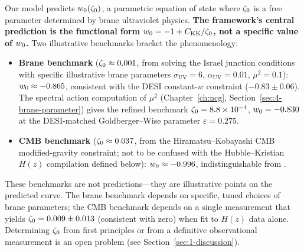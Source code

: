 Our model predicts $w_0(\zeta_0)$, a parametric equation of state where $\zeta_0$ is a free parameter determined by brane ultraviolet physics. \textbf{The framework's central prediction is the functional form $w_0 = -1 + C_{\mathrm{KK}}/\zeta_0$, not a specific value of $w_0$.} Two illustrative benchmarks bracket the phenomenology:
\begin{itemize}
\item \textbf{Brane benchmark} ($\zeta_0 \approx 0.001$, from solving the Israel junction conditions with specific illustrative brane parameters $\sigma_\mathrm{UV} = 6$, $\alpha_\mathrm{UV} = 0.01$, $\mu^2 = 0.1$): $w_0 \approx -0.865$, consistent with the DESI constant-$w$ constraint ($-0.83 \pm 0.06$). The spectral action computation of $\mu^2$ (Chapter~\ref{ch:ncg}, Section~\ref{sec:4-brane-parameter}) gives the refined benchmark $\zeta_0 = 8.8 \times 10^{-4}$, $w_0 = -0.830$ at the DESI-matched Goldberger--Wise parameter $\varepsilon = 0.275$.
\item \textbf{CMB benchmark} ($\zeta_0 \approx 0.037$, from the Hiramatsu--Kobayashi CMB modified-gravity constraint; not to be confused with the Hubble--Kristian $H(z)$ compilation defined below): $w_0 \approx -0.996$, indistinguishable from \LCDM.
\end{itemize}
These benchmarks are not predictions---they are illustrative points on the predicted curve. The brane benchmark depends on specific, tuned choices of brane parameters; the CMB benchmark depends on a single measurement that yields $\zeta_0 = 0.009 \pm 0.013$ (consistent with zero) when fit to $H(z)$ data alone. Determining $\zeta_0$ from first principles or from a definitive observational measurement is an open problem (see Section~\ref{sec:1-discussion}).

\bigskip
\noindent{}\bigskip


